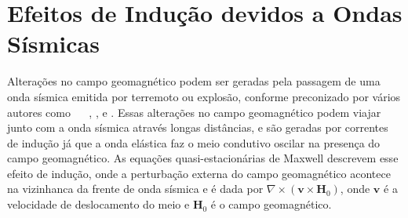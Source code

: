 \section{Efeitos de Indu\c{c}\~ao devidos a Ondas S\'ismicas}

Altera\c{c}\~oes no campo geomagn\'etico podem ser geradas  pela passagem de uma onda s\'ismica emitida por terremoto ou explos\~ao, conforme preconizado por v\'arios autores como $\quad$    \cite{Knopoff_1955}, \cite{eringen_1963}, \cite{guglielmi_86a} e \cite{guglielmi_86b}. Essas altera\c{c}\~oes no campo geomagn\'etico podem viajar junto com a onda s\'ismica atrav\'es longas dist\^ancias, e s\~ao geradas por correntes de indu\c{c}\~ao j\'a que a onda el\'astica faz o meio condutivo oscilar na presen\c{c}a do campo geomagn\'etico. As equa\c{c}\~oes quasi-estacion\'arias de Maxwell descrevem esse efeito de indu\c{c}\~ao, onde a perturba\c{c}\~ao externa do campo geomagn\'etico acontece na vizinhanca da frente de onda s\'ismica e \'e dada por $\nabla\times(\mathbf{v}\times\mathbf{H}_0)$, onde $\mathbf{v}$ \'e a velocidade de deslocamento do meio e $\mathbf{H}_0$ \'e o campo geomagn\'etico. 


